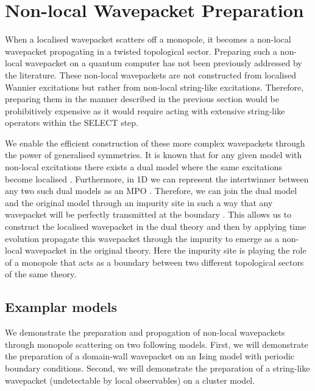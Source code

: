 \documentclass[aps,floatfix,10pt,amssymb,amsfont,amsmath,superscriptaddress,float,nofootinbib,longbibliography,nobalancelastpage,twocolumn,prx]{revtex4-2}
\begin{document}
\section{Non-local Wavepacket Preparation}
\label{section:nonlocalwavepacket}
When a localised wavepacket scatters off a monopole, it becomes a non-local wavepacket propagating in a twisted topological sector. Preparing such a non-local wavepacket on a quantum computer has not been previously addressed by the literature. These non-local wavepackets are not constructed from localised Wannier excitations but rather from non-local string-like excitations. Therefore, preparing them in the manner described in the previous section would be prohibitively expensive as it would require acting with extensive string-like operators within the \textsc{SELECT} step.

We enable the efficient construction of these more complex wavepackets through the power of generalised symmetries. It is known that for any given model with non-local excitations there exists a dual model where the same excitations become localised \cite{}. Furthermore, in 1D we can represent the intertwinner between any two such dual models as an MPO \cite{}. Therefore, we can join the dual model and the original model through an impurity site in such a way that any wavepacket will be perfectly transmitted at the boundary \cite{}. This allows us to construct the localised wavepacket in the dual theory and then by applying time evolution propagate this wavepacket through the impurity to emerge as a non-local wavepacket in the original theory. Here the impurity site is playing the role of a monopole that acts as a boundary between two different topological sectors of the same theory.

\subsection{Examplar models}
We demonstrate the preparation and propagation of non-local wavepackets through monopole scattering on two following models. First, we will demonstrate the preparation of a domain-wall wavepacket on an Ising model with periodic boundary conditions. Second, we will demonstrate the preparation of a string-like wavepacket (undetectable by local observables) on a cluster model.
\end{document}
